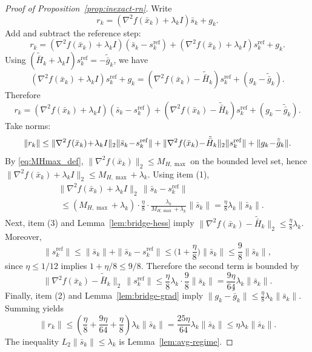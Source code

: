 \documentclass[review,onefignum,onetabnum]{siamart171218}
\begin{document}
\begin{proof}[Proof of Proposition~\ref{prop:inexact-rn}]
Write
\[
r_k=(\nabla^2 f(\bar x_k)+\lambda_k I)\bar s_k+g_k.
\]
Add and subtract the reference step:
\[
r_k=(\nabla^2 f(\bar x_k)+\lambda_k I)(\bar s_k-s_k^{\mathrm{ref}})
+(\nabla^2 f(\bar x_k)+\lambda_k I)s_k^{\mathrm{ref}}+g_k.
\]
Using $(\tilde{\bar H}_k+\lambda_k I)s_k^{\mathrm{ref}}=-\tilde{\bar g}_k$, we have
\[
(\nabla^2 f(\bar x_k)+\lambda_k I)s_k^{\mathrm{ref}}+g_k
=(\nabla^2 f(\bar x_k)-\tilde{\bar H}_k)s_k^{\mathrm{ref}}+(g_k-\tilde{\bar g}_k).
\]
Therefore
\[
r_k=(\nabla^2 f(\bar x_k)+\lambda_k I)(\bar s_k-s_k^{\mathrm{ref}})
+(\nabla^2 f(\bar x_k)-\tilde{\bar H}_k)s_k^{\mathrm{ref}}+(g_k-\tilde{\bar g}_k).
\]
Take norms:
\[
\|r_k\|
\le \|\nabla^2 f(\bar x_k)\!+\!\lambda_k I\|_2\|\bar s_k\!-\!s_k^{\mathrm{ref}}\|\\
+\|\nabla^2 f(\bar x_k)\!-\!\tilde{\bar H}_k\|_2\|s_k^{\mathrm{ref}}\|
+\|g_k\!-\!\tilde{\bar g}_k\|.
\]
By \eqref{eq:MHmax_def}, $\|\nabla^2 f(\bar x_k)\|_2\le M_{H,\max}$ on the bounded level set, hence
$\|\nabla^2 f(\bar x_k)+\lambda_k I\|_2\le M_{H,\max}+\lambda_k$.
Using item (1),
\begin{align*}
&\|\nabla^2 f(\bar x_k)\!+\!\lambda_k I\|_2\,\|\bar s_k\!-\!s_k^{\mathrm{ref}}\|\\
&\;\le (M_{H,\max}\!+\!\lambda_k)\!\cdot\!\tfrac{\eta}{8}\!\cdot\!\tfrac{\lambda_k}{M_{H,\max}+\lambda_k}\|\bar s_k\|
=\tfrac{\eta}{8}\lambda_k\|\bar s_k\|.
\end{align*}
Next, item (3) and Lemma~\ref{lem:bridge-hess} imply
$\|\nabla^2 f(\bar x_k)-\tilde{\bar H}_k\|_2\le \frac{\eta}{8}\lambda_k$.
Moreover,
\[
\|s_k^{\mathrm{ref}}\|\le \|\bar s_k\|+\|\bar s_k-s_k^{\mathrm{ref}}\|
\le \Big(1+\frac{\eta}{8}\Big)\|\bar s_k\|\le \frac98\|\bar s_k\|,
\]
since $\eta\le 1/12$ implies $1+\eta/8\le 9/8$.
Therefore the second term is bounded by
\[
\|\nabla^2 f(\bar x_k)-\tilde{\bar H}_k\|_2\,\|s_k^{\mathrm{ref}}\|
\le \frac{\eta}{8}\lambda_k\cdot \frac98\|\bar s_k\|=\frac{9\eta}{64}\lambda_k\|\bar s_k\|.
\]
Finally, item (2) and Lemma~\ref{lem:bridge-grad} imply $\|g_k-\tilde{\bar g}_k\|\le \frac{\eta}{8}\lambda_k\|\bar s_k\|$.
Summing yields
\[
\|r_k\|\le \left(\frac{\eta}{8}+\frac{9\eta}{64}+\frac{\eta}{8}\right)\lambda_k\|\bar s_k\|
=\frac{25\eta}{64}\lambda_k\|\bar s_k\|\le \eta\lambda_k\|\bar s_k\|.
\]
The inequality $L_2\|\bar s_k\|\le \lambda_k$ is Lemma~\ref{lem:avg-regime}.
\end{proof}
\end{document}
